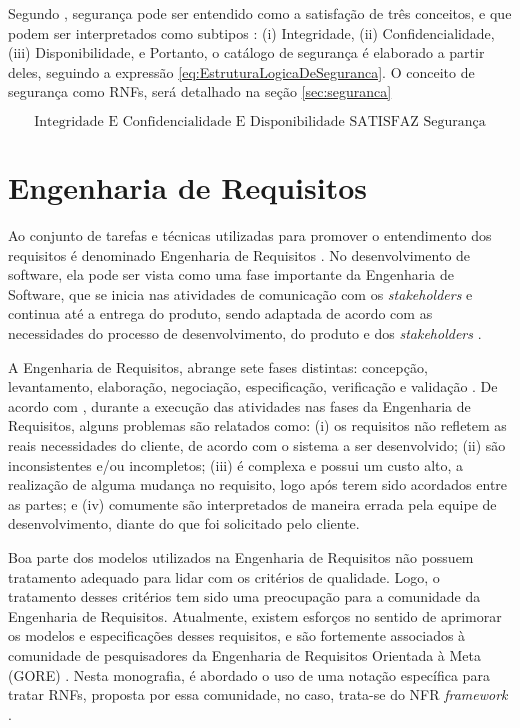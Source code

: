 Segundo \cite{chung2012non}, segurança pode ser entendido como a satisfação de três conceitos, e que podem ser interpretados como subtipos : (i) Integridade, (ii) Confidencialidade, (iii) Disponibilidade, e Portanto, o catálogo de segurança é elaborado a partir deles, seguindo a expressão \ref{eq:EstruturaLogicaDeSeguranca}. O conceito de segurança como RNFs, será detalhado na seção \ref{sec:seguranca}

\begin{equation}
	\label{eq:EstruturaLogicaDeSeguranca}
	\textrm{Integridade E Confidencialidade E Disponibilidade SATISFAZ Segurança}
\end{equation}

\section{Engenharia de Requisitos}
\label{sec:requisitos}

Ao conjunto de tarefas e técnicas utilizadas para promover o entendimento dos requisitos é denominado Engenharia de Requisitos \cite{pressman2011engenharia}. No desenvolvimento de software, ela pode ser vista como uma fase importante da Engenharia de Software, que se inicia nas atividades de comunicação com os \textit{stakeholders} e continua até a entrega do produto, sendo adaptada de acordo com as necessidades do processo de desenvolvimento, do produto e dos \textit{stakeholders} \cite{pressman2011engenharia}.

A Engenharia de Requisitos, abrange sete fases distintas: concepção, levantamento, elaboração, negociação, especificação, verificação e validação \cite{pressman2011engenharia}. De acordo com \cite{kotonya1998requirements}, durante a execução das atividades nas fases da Engenharia de Requisitos, alguns problemas são relatados como: (i) os requisitos não refletem as reais necessidades do cliente, de acordo com o sistema a ser desenvolvido; (ii) são inconsistentes e/ou incompletos; (iii) é complexa e possui um custo alto, a realização de alguma mudança no requisito, logo após terem sido acordados entre as partes; e (iv) comumente são interpretados de maneira errada pela equipe de desenvolvimento, diante do que foi solicitado pelo cliente. 


Boa parte dos modelos utilizados na Engenharia de Requisitos não possuem tratamento adequado para lidar com os critérios de qualidade. Logo, o tratamento desses critérios tem sido uma preocupação para a comunidade da Engenharia de Requisitos. Atualmente, existem esforços no sentido de aprimorar os modelos e especificações desses requisitos, e são fortemente associados à comunidade de pesquisadores da Engenharia de Requisitos Orientada à Meta (GORE) \cite{chung2012non}. Nesta monografia, é abordado o uso de uma notação específica para tratar RNFs, proposta por essa comunidade, no caso, trata-se do NFR \textit{framework} \cite{chung2012non}. 

